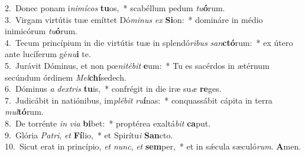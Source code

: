 {2.~}Donec ponam i\textit{ni}\textit{mí}\textit{cos} \textbf{tu}os,~* scabéllum pedum \textit{tu}\textbf{ó}rum.\\
{3.~}Virgam virtútis tuæ emíttet Dó\textit{mi}\textit{nus} \textit{ex} \textbf{Si}on:~* domináre in médio inimicórum \textit{tu}\textbf{ó}rum.\\
{4.~}Tecum princípium in die virtútis tuæ in splendó\textit{ri}\textit{bus} \textit{san}\textbf{ctó}rum:~* ex útero ante lucíferum gé\textit{nu}\textbf{i} te.\\
{5.~}Jurávit Dóminus, et non pœ\textit{ni}\textit{té}\textit{bit} \textbf{e}um:~* Tu es sacérdos in ætérnum secúndum órdinem \textit{Mel}\textbf{chí}sedech.\\
{6.~}Dóminus \textit{a} \textit{dex}\textit{tris} \textbf{tu}is,~* confrégit in die iræ su\textit{æ} \textbf{re}ges.\\
{7.~}Judicábit in natiónibus, im\textit{plé}\textit{bit} \textit{ru}\textbf{í}nas:~* conquassábit cápita in terra \textit{mul}\textbf{tó}rum.\\
{8.~}De torrénte \textit{in} \textit{vi}\textit{a} \textbf{bi}bet:~* proptérea exaltá\textit{bit} \textbf{ca}put.\\
{9.~}Glória \textit{Pa}\textit{tri}, \textit{et} \textbf{Fí}lio,~* et Spirítu\textit{i} \textbf{San}cto.\\
{10.~}Sicut erat in princípio, \textit{et} \textit{nunc}, \textit{et} \textbf{sem}per,~* et in sǽcula sæculó\textit{rum}. \textbf{A}men.\\
